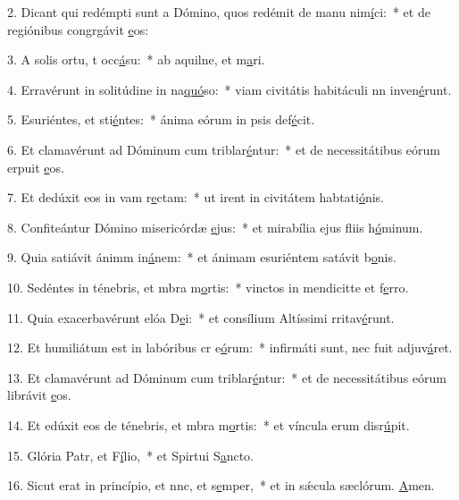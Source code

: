 2. Dicant qui redémpti sunt a Dómino, quos redémit de manu nim\uline{í}ci:~* et de regiónibus congrgávit \uline{e}os:\par 
3. A solis ortu, t occ\uline{á}su:~* ab aquilne, et m\uline{a}ri.\par 
4. Erravérunt in solitúdine in na\uline{quó}so:~* viam civitátis habitáculi nn inven\uline{é}runt.\par 
5. Esuriéntes, et sti\uline{é}ntes:~* ánima eórum in psis def\uline{é}cit.\par 
6. Et clamavérunt ad Dóminum cum triblar\uline{é}ntur:~* et de necessitátibus eórum erpuit \uline{e}os.\par 
7. Et dedúxit eos in vam r\uline{e}ctam:~* ut irent in civitátem habtati\uline{ó}nis.\par 
8. Confiteántur Dómino misericórdæ \uline{e}jus:~* et mirabília ejus fliis h\uline{ó}minum.\par 
9. Quia satiávit ánimm in\uline{á}nem:~* et ánimam esuriéntem satávit b\uline{o}nis.\par 
10. Sedéntes in ténebris, et mbra m\uline{o}rtis:~* vinctos in mendicitte et f\uline{e}rro.\par 
11. Quia exacerbavérunt elóa D\uline{e}i:~* et consílium Altíssimi rritav\uline{é}runt.\par 
12. Et humiliátum est in labóribus cr e\uline{ó}rum:~* infirmáti sunt, nec fuit  adjuv\uline{á}ret.\par 
13. Et clamavérunt ad Dóminum cum triblar\uline{é}ntur:~* et de necessitátibus eórum librávit \uline{e}os.\par 
14. Et edúxit eos de ténebris, et mbra m\uline{o}rtis:~* et víncula erum disr\uline{ú}pit.\par 
15. Glória Patr, et F\uline{í}lio,~* et Spirtui S\uline{a}ncto.\par 
16. Sicut erat in princípio, et nnc, et s\uline{e}mper,~* et in sǽcula sæclórum. \uline{A}men.\par 
